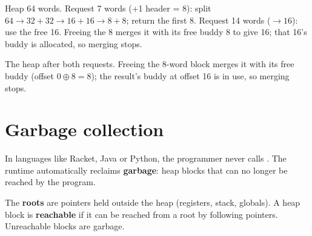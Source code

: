 \begin{example}
Heap 64 words. Request 7 words (+1 header = 8): split $64\to32+32\to16+16\to8+8$; return the
first 8. Request 14 words ($\to 16$): use the free 16. Freeing the 8 merges it with its free
buddy 8 to give 16; that 16's buddy is allocated, so merging stops.
\end{example}
\begin{center}

\small The heap after both requests. Freeing the 8-word block merges it with its free buddy
(offset $0\oplus 8 = 8$); the result's buddy at offset 16 is in use, so merging stops.
\end{center}

\section{Garbage collection}

In languages like Racket, Java or Python, the programmer never calls . The
runtime automatically reclaims \textbf{garbage}: heap blocks that can no longer be reached by
the program.

\begin{definition}
The \textbf{roots} are pointers held outside the heap (registers, stack, globals). A heap block
is \textbf{reachable} if it can be reached from a root by following pointers. Unreachable
blocks are garbage.
\end{definition}

